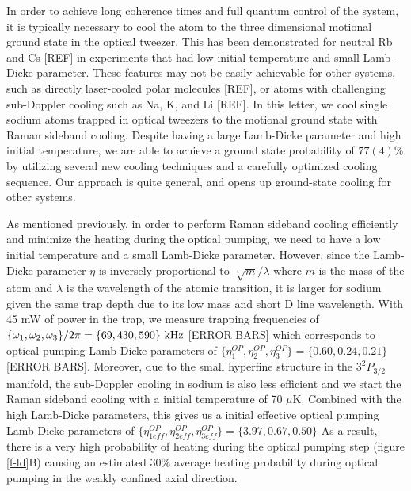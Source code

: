 \documentclass[aps,prl,twocolumn,groupedaddress]{revtex4-1}
\begin{document}
In order to achieve long coherence times and full quantum control of the system,
it is typically necessary to cool the atom to the
three dimensional motional ground state in the optical tweezer.
This has been demonstrated for neutral Rb and Cs [REF] in experiments that had low initial temperature and small Lamb-Dicke parameter.  
These features
may not be easily achievable for other systems, such as directly laser-cooled polar molecules [REF],
or atoms with challenging sub-Doppler cooling such as Na, K, and Li [REF].
In this letter, we cool single sodium atoms
trapped in optical tweezers to the motional ground state with Raman sideband cooling.
Despite having a large Lamb-Dicke parameter and high initial temperature, we are able to achieve a ground state probability of $77(4)\%$
by utilizing several new cooling techniques and a carefully optimized cooling sequence.  Our approach is quite general, and opens up ground-state cooling for other systems.

As mentioned previously, in order to perform Raman sideband cooling efficiently and
minimize the heating during the optical pumping, we need to have a low initial temperature and
a small Lamb-Dicke parameter. However, since the Lamb-Dicke parameter $\eta$ is inversely
proportional to $\sqrt[4]{m}/\lambda$ where $m$ is the mass of the atom and $\lambda$
is the wavelength of the atomic transition,
it is larger for sodium given the same trap depth due to its low mass and short D line wavelength.
With 45 mW of power in the trap, we measure trapping frequencies of
$\{\omega_1,\omega_2,\omega_3\}/2\pi = \{69, 430, 590\}\ \text{\text{kHz}}$ [ERROR BARS]
which corresponds to optical pumping Lamb-Dicke parameters of
$\{\eta^{OP}_1,\eta^{OP}_2,\eta^{OP}_3\} = \{0.60, 0.24, 0.21\}$ [ERROR BARS].
Moreover, due to the small hyperfine structure in the $3^2P_{3/2}$ manifold,
the sub-Doppler cooling in sodium is also less efficient and we start the
Raman sideband cooling with a initial temperature of 70 $\mu$K. Combined with the high Lamb-Dicke
parameters, this gives us a initial effective optical pumping Lamb-Dicke parameters of
$\{\eta^{OP}_{1eff},\eta^{OP}_{2eff},\eta^{OP}_{3eff}\} = \{3.97, 0.67, 0.50\}$
As a result, there is a very high probability of heating during the optical pumping step
(figure \ref{f-ld}B) causing an estimated $30\%$ average heating probability during optical pumping
in the weakly confined axial direction. 
\end{document}
